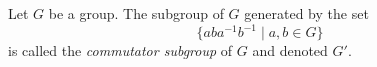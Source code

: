 Let $G$ be a group. The subgroup of $G$ generated by the set
$$\{aba^{-1}b^{-1} \mid a,b \in G\}$$
is called the \emph{commutator subgroup} of $G$ and denoted $G'$.
